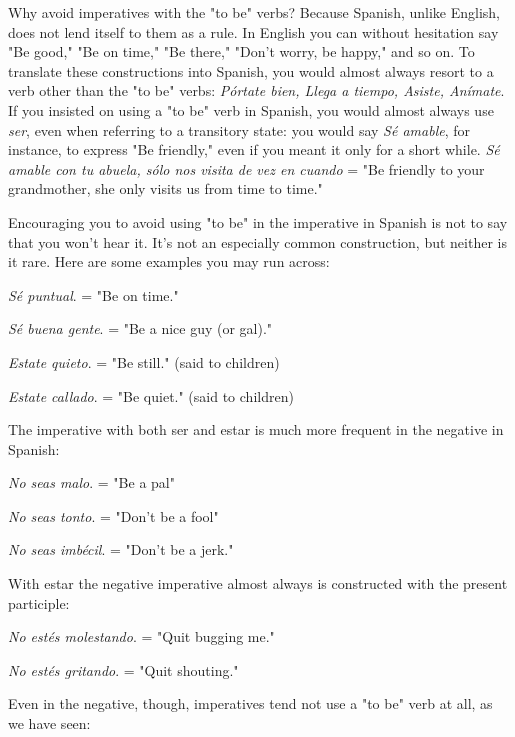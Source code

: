 \documentclass[14pt,a4paper,oneside]{memoir}
\newcommand{\bsk}{\vspace{20pt}}
\newcommand{\indu}{\hspace{20pt}}
\begin{document}
Why avoid imperatives with the "to be" verbs? Because Spanish, unlike English, does not lend itself to them as a rule. In English
you can without hesitation say "Be good," "Be on time," "Be there,"
"Don't worry, be happy," and so on. To translate these constructions
into Spanish, you would almost always resort to a verb other than the
"to be" verbs: \emph{Pórtate bien, Llega a tiempo, Asiste, Anímate}. If you
insisted on using a "to be" verb in Spanish, you would almost always
use \emph{ser}, even when referring to a transitory state: you would say \emph{Sé
	amable}, for instance, to express "Be friendly," even if you meant it
only for a short while. \emph{Sé amable con tu abuela, sólo nos visita de vez
	en cuando} = "Be friendly to your grandmother, she only visits us from
time to time."

Encouraging you to avoid using "to be" in the imperative in
Spanish is not to say that you won't hear it. It's not an especially common construction, but neither is it rare. Here are some examples you
may run across:

\bsk

\indu \emph{Sé puntual}. = "Be on time."

\indu \emph{Sé buena gente}. = "Be a nice guy (or gal)."

\indu \emph{Estate quieto}. = "Be still." (said to children)

\indu \emph{Estate callado}. = "Be quiet." (said to children)

\bsk

The imperative with both ser and estar is much more frequent
in the negative in Spanish:

\bsk

\indu \emph{No seas malo}. = "Be a pal"

\indu \emph{No seas tonto}. = "Don't be a fool"

\indu \emph{No seas imbécil}. = "Don't be a jerk."

\bsk

With estar the negative imperative almost always is constructed with the present participle:

\bsk

\indu \emph{No estés molestando}. = "Quit bugging me."

\indu \emph{No estés gritando}. = "Quit shouting."

\bsk

Even in the negative, though, imperatives tend not use a "to
be" verb at all, as we have seen:
\end{document}
